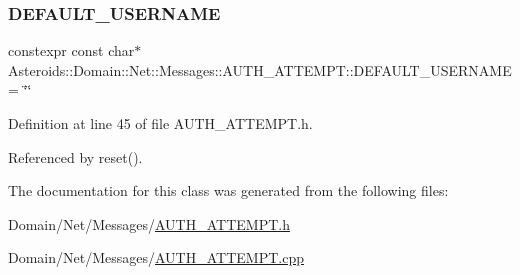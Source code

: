 \subsubsection{\texorpdfstring{D\+E\+F\+A\+U\+L\+T\+\_\+\+U\+S\+E\+R\+N\+A\+ME}{DEFAULT\_USERNAME}}
{\footnotesize\ttfamily constexpr const char$\ast$ Asteroids\+::\+Domain\+::\+Net\+::\+Messages\+::\+A\+U\+T\+H\+\_\+\+A\+T\+T\+E\+M\+P\+T\+::\+D\+E\+F\+A\+U\+L\+T\+\_\+\+U\+S\+E\+R\+N\+A\+ME = \char`\"{}\char`\"{}\hspace{0.3cm}{\ttfamily [static]}}



Definition at line 45 of file A\+U\+T\+H\+\_\+\+A\+T\+T\+E\+M\+P\+T.\+h.



Referenced by reset().



The documentation for this class was generated from the following files\+:\begin{DoxyCompactItemize}
\item 
Domain/\+Net/\+Messages/\hyperlink{AUTH__ATTEMPT_8h}{A\+U\+T\+H\+\_\+\+A\+T\+T\+E\+M\+P\+T.\+h}\item 
Domain/\+Net/\+Messages/\hyperlink{AUTH__ATTEMPT_8cpp}{A\+U\+T\+H\+\_\+\+A\+T\+T\+E\+M\+P\+T.\+cpp}\end{DoxyCompactItemize}
